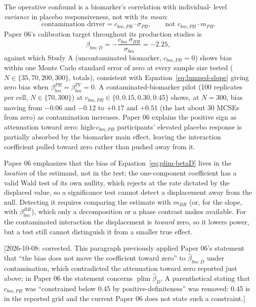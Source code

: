 \documentclass[11pt]{article}
\newcommand{\note}[1]{\textcolor{blue!60!black}{\small [#1]}}
\begin{document}
The operative confound is a biomarker's correlation with individual-
level \emph{variance} in placebo responsiveness, not with its
\emph{mean}:
\begin{equation}
\text{contamination driver} = c_{bm,PB}\cdot\sigma_{PB}, \qquad
  \text{not } c_{bm,PB}\cdot m_{PB}.
\label{eq:contamination-driver}
\end{equation}
Paper 06's calibration target throughout its production studies is
\begin{equation}
\beta_{bm:D} = -\frac{c_{bm}\,\sigma_{BR}}{\sigma_{bm}} = -2.25,
\label{eq:beta-target}
\end{equation}
against which Study A (uncontaminated biomarker, $c_{bm,PB}=0$) shows
bias within one Monte Carlo standard error of zero at every sample
size tested ($N \in \{35,70,200,300\}$, totals), consistent with
Equation~\eqref{eq:lumped-slope} giving zero bias when
$\beta_{bm}^{PB} = \beta_{bm}^{TV} = 0$. A contaminated-biomarker pilot
(100 replicates per cell, $N \in \{70, 300\}$) at $c_{bm,PB} \in \{0,
0.15, 0.30, 0.45\}$ shows, at $N = 300$, bias moving from $-0.06$ and
$-0.12$ to $+0.17$ and $+0.51$ (the last about 30 MCSEs from zero) as
contamination increases. Paper 06 explains the positive sign as
attenuation toward zero: high-$c_{bm,PB}$ participants' elevated
placebo response is partially absorbed by the biomarker main effect,
leaving the interaction coefficient pulled toward zero rather than
pushed away from it.

Paper 06 emphasizes that the bias of Equation~\eqref{eq:plim-betaD}
lives in the \emph{location} of the estimand, not in the test: the
one-component coefficient has a valid Wald test of its own nullity,
which rejects at the rate dictated by the displaced value, so a
significance test cannot detect a displacement away from the null.
Detecting it requires comparing the estimate with $m_{BR}$ (or, for
the slope, with $\beta_{bm}^{BR}$), which only a decomposition or a
phase contrast makes available. For the contaminated interaction the
displacement is \emph{toward} zero, so it lowers power, but a test
still cannot distinguish it from a smaller true effect.

\note{2026-10-08: corrected. This paragraph previously applied Paper
06's statement that ``the bias does not move the coefficient toward
zero'' to $\hat\beta_{bm:D}$ under contamination, which
contradicted the attenuation toward zero reported just above; in
Paper 06 the statement concerns $\operatorname{plim}\hat\beta_D$. A
parenthetical stating that $c_{bm,PB}$ was ``constrained below 0.45 by
positive-definiteness'' was removed: 0.45 is in the reported grid and
the current Paper 06 does not state such a constraint.}
\end{document}
